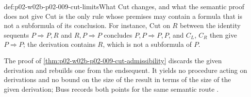 \begin{hbwarning}{def:p02-w02b-p02-009-cut-limits}{What Cut changes, and what the semantic proof does not give}
Cut is the only rule whose premises may contain a formula that is not a
subformula of its conclusion.  For instance, Cut on \(R\) between the
identity sequents \(P\Rightarrow P,R\) and \(R,P\Rightarrow P\) concludes
\(P,P\Rightarrow P,P\), and \(C_L\), \(C_R\) then give \(P\Rightarrow P\);
the derivation contains \(R\), which is not a subformula of \(P\).

The proof of \cref{thm:p02-w02b-p02-009-cut-admissibility} discards the
given derivation and rebuilds one from the endsequent.  It yields no
procedure acting on derivations and no bound on the size of the result in
terms of the size of the given derivation; Buss records both points for
the same semantic route \cite[Sec.~1.2.11, pp.~15--16]{Buss1998Intro}.
\end{hbwarning}

